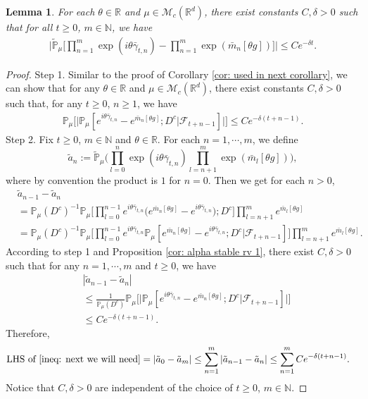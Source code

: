 \documentclass[12pt,a4paper]{amsart}
\theoremstyle{plain}
\newtheorem{lem}[thm]{Lemma}
\theoremstyle{definition}
\numberwithin{equation}{section}
\begin{document}
\begin{lem}\label{lem:lemma03}
    For each $\theta\in \mathbb{R}$ and $\mu \in \mathcal{M}_c(\mathbb{R}^d)$, there exist constants $C,\delta>0$ such that for all $t\geq 0$, $m\in\mathbb{N}$, we have
    \begin{align}\label{ineq: next we will need}
        \Big|\tilde{\mathbb{P}}_{\mu}\Big[\prod_{n=1}^m\exp(i\theta\bar{\gamma}_{t,n})-\prod_{n=1}^m\exp(\bar{m}_n[\theta g])\Big]\Big|\leq C e^{-\delta t}.
    \end{align}
\end{lem}
\begin{proof}
Step 1. Similar to the proof of Corollary \ref{cor: used in next corollary}, we can show that  for any  $\theta\in \mathbb{R}$ and $\mu\in \mathcal{M}_c(\mathbb{R}^d)$, there exist constants $C,\delta>0$ such that, for any $t\geq 0$, $n\geq 1$, we have
\begin{align}
    \mathbb{P}_{\mu}\Big[\big|\mathbb{P}_{\mu}[e^{i\theta\bar{\gamma}_{t,n}}-e^{\bar{m}_n[\theta g]}; D^c | \mathscr F_{t+n-1}]\big|\Big]\leq Ce^{-\delta(t+n-1)}.
\end{align}
Step 2.   Fix $t\geq 0$, $m\in \mathbb{N}$ and $\theta\in \mathbb{R}$.
    For each $n=1,\cdots,m$, we define
    \[\tilde{a}_n:=\mathbb{\tilde{P}}_{\mu}\Big(\prod_{l=0}^{n}\exp\left(i\theta\bar{\gamma}_{t,n}\right)\prod_{l=n+1}^{m}\exp(\bar{m}_l[\theta g])\Big),\]
     where by convention the product is $1$ for $n=0$. Then we get for each $n > 0$,
    \begin{align*}
        &\tilde{a}_{n-1} - \tilde{a}_n
        \\&=\mathbb{P}_{\mu}(D^c)^{-1}\mathbb{P}_{\mu}\Big[\prod_{l=0}^{n-1}e^{i\theta\bar{\gamma}_{t,n}}\Big(e^{\bar{m}_n[\theta g]}-e^{i\theta \bar{\gamma}_{t,n}}\Big);D^c\Big]\prod_{l=n+1}^{m}e^{\bar{m}_l[\theta g]}
        \\&=\mathbb{P}_{\mu}(D^c)^{-1}\mathbb{P}_{\mu}\Big[\prod_{l=0}^{n-1}e^{i\theta\bar{\gamma}_{t,n}}\mathbb{P}_{\mu}[e^{\bar{m}_n[\theta g]}-e^{i\theta \bar{\gamma}_{t,n}};D^c|\mathscr{F}_{t+n-1}]\Big]\prod_{l=n+1}^{m}e^{\bar{m}_l[\theta g]}.
    \end{align*}
   According to step 1 and Proposition \ref{cor: alpha stable rv 1},
    there exist $C,\delta>0$ such that for any $n=1,\cdots, m$ and $t\geq0$, we have
    \begin{align*}
        &|\tilde{a}_{n-1}- \tilde{a}_n|
        \\&\leq \frac{1}{\mathbb{P}_{\mu}(D^c)}\mathbb{P}_{\mu}\Big[\big|\mathbb P_\mu[e^{i\theta\bar{\gamma}_{t,n}}-e^{\bar{m}_n[\theta g]}; D^c\big|\mathscr{F}_{t+n-1}]\big|\Big]
        \\& \leq C e^{-\delta(t+n-1)}.
    \end{align*}
Therefore,
\begin{align}
    \text{LHS of \eqref{ineq: next we will need}}&= \left|\tilde{a}_{0}-\tilde{a}_m\right|
    \leq\sum_{n=1}^m\left|\tilde{a}_{n-1}-\tilde{a}_n\right|
    \leq \sum_{n=1}^m C e^{-\delta(t+n-1)}.
\end{align}
	Notice that $C, \delta>0$ are independent of the choice of $t\geq 0$, $m\in \mathbb{N}$.
\end{proof}
\end{document}

